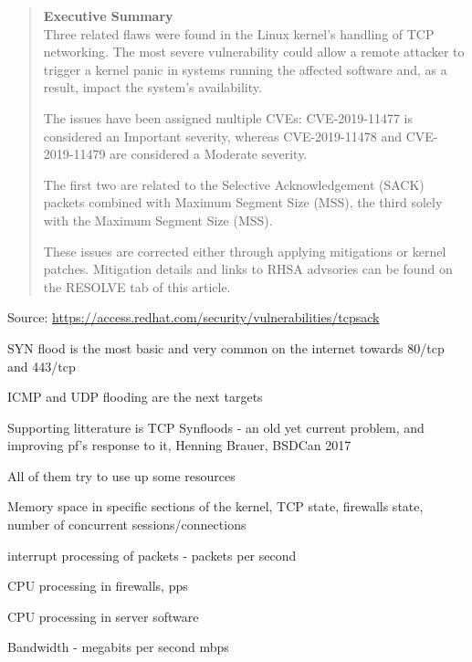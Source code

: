 \documentclass[Screen16to9,17pt]{foils}
\begin{document}
\begin{quote}\footnotesize{\bf
Executive Summary}\\
Three related flaws were found in the Linux kernel’s handling of TCP networking.  The most severe vulnerability could allow a remote attacker to trigger a kernel panic in systems running the affected software and, as a result, impact the system’s availability.

The issues have been assigned multiple CVEs: CVE-2019-11477 is considered an Important severity, whereas CVE-2019-11478 and CVE-2019-11479 are considered a Moderate severity.

The first two are related to the Selective Acknowledgement (SACK) packets combined with Maximum Segment Size (MSS), the third solely with the Maximum Segment Size (MSS).

These issues are corrected either through applying mitigations or kernel patches.  Mitigation details and links to RHSA advsories can be found on the RESOLVE tab of this article.
\end{quote}

Source: {\footnotesize\url{https://access.redhat.com/security/vulnerabilities/tcpsack}}



\begin{list2}
\item SYN flood is the most basic and very common on the internet towards 80/tcp and 443/tcp
\item ICMP and UDP flooding are the next targets
\item Supporting litterature is TCP Synfloods - an old yet current problem, and improving pf's response to it, Henning Brauer, BSDCan 2017
\item All of them try to use up some resources
\begin{list2}
\item Memory space in specific sections of the kernel, TCP state, firewalls state, number of concurrent sessions/connections
\item interrupt processing of packets - packets per second
\item CPU processing in firewalls, pps
\item CPU processing in server software
\item Bandwidth - megabits per second mbps
\end{list2}
\end{list2}
\end{document}
